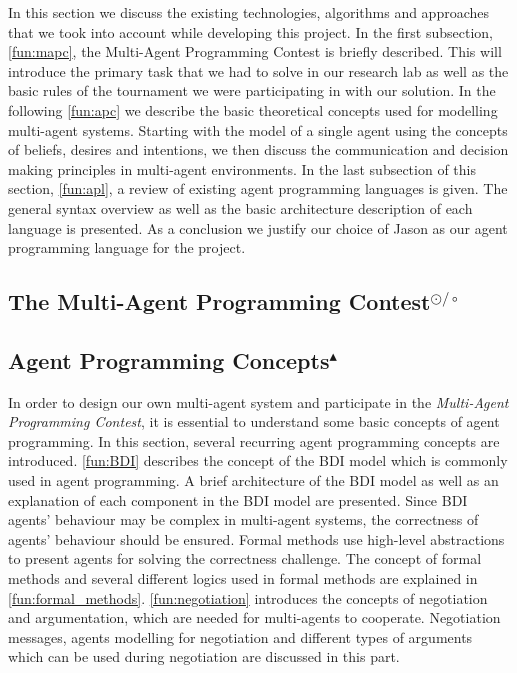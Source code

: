 In this section we discuss the existing technologies, algorithms and approaches that we took into account while developing this project.
In the first subsection, \autoref{fun:mapc}, the Multi-Agent Programming Contest is briefly described.
This will introduce the primary task that we had to solve in our research lab as well as the basic rules of the tournament we were participating in with our solution.
In the following \autoref{fun:apc} we describe the basic theoretical concepts used for modelling multi-agent systems.
Starting with the model of a single agent using the concepts of beliefs, desires and intentions, we then discuss the communication and decision making principles in multi-agent environments.
In the last subsection of this section, \autoref{fun:apl}, a review of existing agent programming languages is given.
The general syntax overview as well as the basic architecture description of each language is presented.
As a conclusion we justify our choice of Jason as our agent programming language for the project.

\subsection[The Multi-Agent Programming Contest]{The Multi-Agent Programming Contest$^{\odot/\circ}$}\label{fun:mapc}


\subsection[Agent Programming Concepts]{Agent Programming Concepts$^{\blacktriangle}$}\label{fun:apc}
In order to design our own multi-agent system and participate in the \emph{Multi-Agent Programming Contest}, it is essential to understand some basic concepts of agent programming.
In this section, several recurring agent programming concepts are introduced.
\autoref{fun:BDI} describes the concept of the BDI model which is commonly used in agent programming.
A brief architecture of the BDI model as well as an explanation of each component in the BDI model are presented.
Since BDI agents' behaviour may be complex in multi-agent systems, the correctness of agents' behaviour should be ensured.
Formal methods use high-level abstractions to present agents for solving the correctness challenge.
The concept of formal methods and several different logics used in formal methods are explained in \autoref{fun:formal_methods}.
\autoref{fun:negotiation} introduces the concepts of negotiation and argumentation, which are needed for multi-agents to cooperate.
Negotiation messages, agents modelling for negotiation and different types of arguments which can be used during negotiation are discussed in this part.

